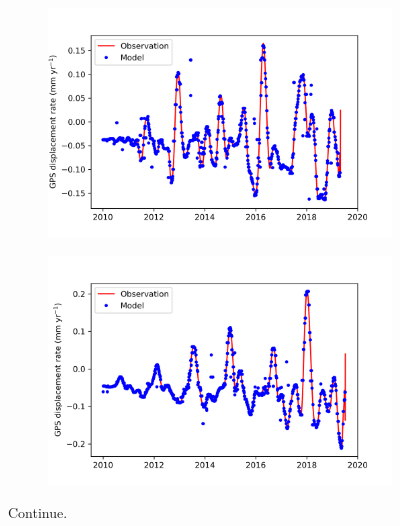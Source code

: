 \documentclass{article}
\begin{document}
\begin{figure}[h!]
     \centering
     \begin{subfigure}[b]{0.48\textwidth}
         \centering
         \includegraphics[width=\textwidth, height = 0.88
         \textwidth ]{P064.png}
         
     \end{subfigure}
     \hfill
     \begin{subfigure}[b]{0.48\textwidth}
         \centering
         \includegraphics[width=\textwidth, height = 0.88
         \textwidth ]{P403.png}
         \label{fig:2}
     \end{subfigure}
     \caption{Continue.}
\end{figure}
\end{document}
